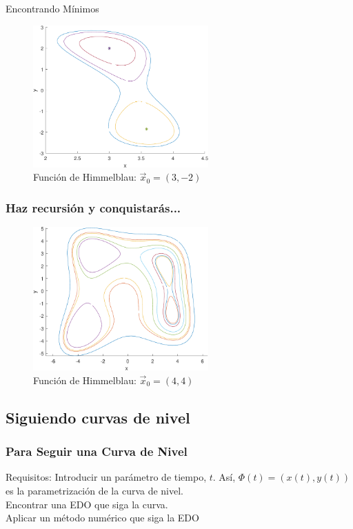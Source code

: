 \documentclass[fleqn]{beamer}\usepackage[]{graphicx}\usepackage[]{xcolor}
\begin{document}
\begin{frame}{Encontrando Mínimos}
    \begin{figure}
        \centering
        \includegraphics[width = 0.6\textwidth]{FirstSplit-cropped.pdf}
        \caption{Función de Himmelblau: $\vec{x}_0 = (3,-2)$}
        \label{fig:my_label}
    \end{figure}
\end{frame}

\begin{frame}
  \frametitle{Haz recursión y conquistarás...}
  \begin{figure}
      \centering
      \includegraphics[width = 0.6\textwidth]{FullMethod.pdf}
      \caption{Función de Himmelblau: $\vec{x}_0 = (4,4)$}
      \label{fig:my_label}
  \end{figure}
\end{frame}


\subsection{Siguiendo curvas de nivel}
\begin{frame}
    \frametitle{Para Seguir una Curva de Nivel}
    \begin{block}{Requisitos:}
        Introducir un parámetro de tiempo, $t$. Así, $\Phi(t) = (x(t),y(t))$ es la parametrización de la curva de nivel.\\
        \vspace{10 pt}
        Encontrar una EDO que siga la curva. \\
        \vspace{10 pt}
        Aplicar un método numérico que siga la EDO
    \end{block}
\end{frame}
\end{document}
